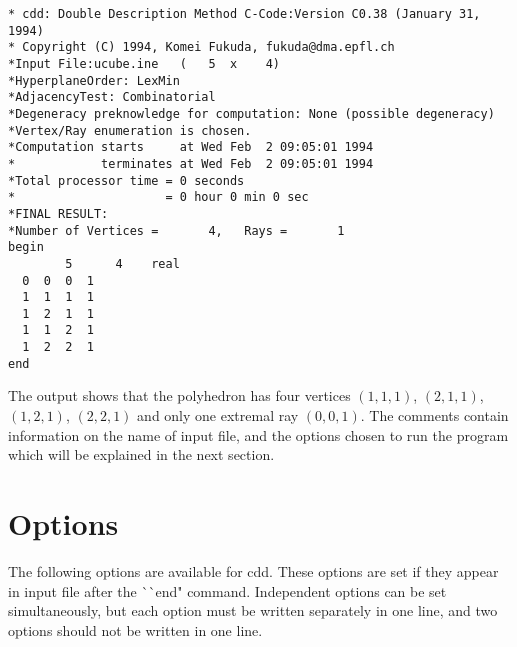 \begin{verbatim}
* cdd: Double Description Method C-Code:Version C0.38 (January 31, 1994)
* Copyright (C) 1994, Komei Fukuda, fukuda@dma.epfl.ch
*Input File:ucube.ine   (   5  x    4)
*HyperplaneOrder: LexMin
*AdjacencyTest: Combinatorial
*Degeneracy preknowledge for computation: None (possible degeneracy)
*Vertex/Ray enumeration is chosen.
*Computation starts     at Wed Feb  2 09:05:01 1994
*            terminates at Wed Feb  2 09:05:01 1994
*Total processor time = 0 seconds
*                     = 0 hour 0 min 0 sec
*FINAL RESULT:
*Number of Vertices =       4,   Rays =       1
begin
        5      4    real
  0  0  0  1
  1  1  1  1
  1  2  1  1
  1  1  2  1
  1  2  2  1
end
\end{verbatim}

The output shows that the polyhedron has four vertices
$(1,1,1)$, $(2,1,1)$, $(1,2,1)$,  $(2,2,1)$ and
only one extremal ray $(0,0,1)$.  The comments contain
information on the name of input file, and the options
chosen to run the program which will be explained in
the next section.

\newpage
\section{Options}  \label{OPTIONS}

The following options are available for cdd.  These options are
set if they appear in input file after the ^^ ^^ end" command.
Independent options can be set simultaneously, but each option
must be written separately in one line, and  two options
should not be written in one line.

